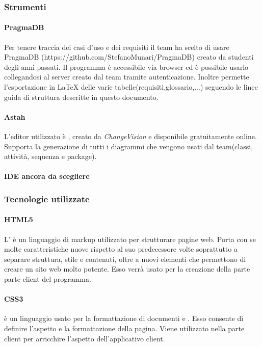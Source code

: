 	\subsubsection{Strumenti}
		\paragraph{PragmaDB}
		Per tenere traccia dei casi d'uso e dei requisiti il team ha scelto di usare PragmaDB (https://github.com/StefanoMunari/PragmaDB) creato da studenti degli anni passati. Il programma è accessibile via browser ed è possibile usarlo collegandosi al server creato dal team tramite autenticazione. Inoltre permette l'esportazione in \LaTeX{} delle varie tabelle(requisiti,glossario,...) seguendo le linee guida di struttura descritte in questo documento.
		\paragraph{Astah}
		L'editor  utilizzato è , creato da \textit{ChangeVision} e disponibile gratuitamente online. Supporta la generazione di tutti i diagrammi che vengono usati dal team(classi, attività, sequenza e package).
		\paragraph{IDE ancora da scegliere}
	\subsubsection{Tecnologie utilizzate}
	\paragraph{HTML5}
	L' è un linguaggio di markup utilizzato per strutturare pagine web. Porta con se molte caratteristiche nuove rispetto al suo predecessore volte soprattutto a separare struttura, stile e contenuti, oltre a nuovi elementi che permettono di creare un sito web molto potente.
	Esso verrà usato per la creazione della parte parte client del programma.
	\paragraph{CSS3}
	 è un linguaggio usato per la formattazione di documenti  e . Esso consente di definire l'aspetto e la formattazione della pagina. Viene utilizzato nella parte client per arricchire l'aspetto dell'applicativo client.
